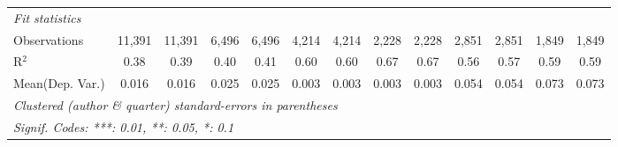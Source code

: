 \begin{tabular}{lcccccccccccc}
   \midrule
   \emph{Fit statistics}\\
   Observations                             & 11,391        & 11,391        & 6,496         & 6,496         & 4,214   & 4,214     & 2,228   & 2,228     & 2,851         & 2,851         & 1,849         & 1,849\\  
   R$^2$                                    & 0.38          & 0.39          & 0.40          & 0.41          & 0.60    & 0.60      & 0.67    & 0.67      & 0.56          & 0.57          & 0.59          & 0.59\\  
Mean(Dep. Var.) & 0.016 & 0.016 & 0.025 & 0.025 & 0.003 & 0.003 & 0.003 & 0.003 & 0.054 & 0.054 & 0.073 & 0.073 \\
   \midrule \midrule
   \multicolumn{13}{l}{\emph{Clustered (author \& quarter) standard-errors in parentheses}}\\
   \multicolumn{13}{l}{\emph{Signif. Codes: ***: 0.01, **: 0.05, *: 0.1}}\\
\end{tabular}
\par\endgroup
